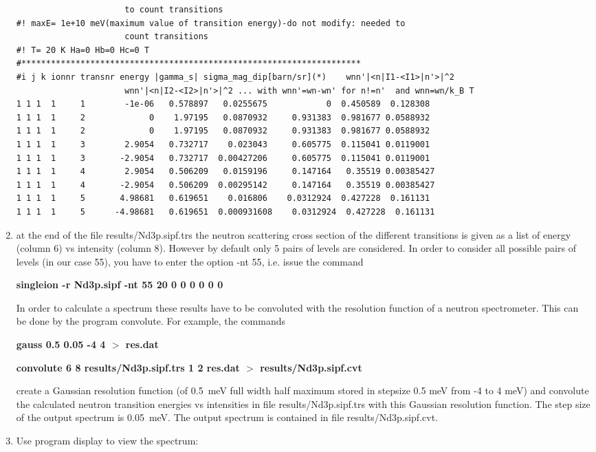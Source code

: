 \begin{enumerate}
{\begin{verbatim}
                      to count transitions
#! maxE= 1e+10 meV(maximum value of transition energy)-do not modify: needed to 
                      count transitions
#! T= 20 K Ha=0 Hb=0 Hc=0 T
#*********************************************************************
#i j k ionnr transnr energy |gamma_s| sigma_mag_dip[barn/sr](*)    wnn'|<n|I1-<I1>|n'>|^2 
                      wnn'|<n|I2-<I2>|n'>|^2 ... with wnn'=wn-wn' for n!=n'  and wnn=wn/k_B T 
1 1 1  1     1        -1e-06   0.578897   0.0255675            0  0.450589  0.128308
1 1 1  1     2             0    1.97195   0.0870932     0.931383  0.981677 0.0588932
1 1 1  1     2             0    1.97195   0.0870932     0.931383  0.981677 0.0588932
1 1 1  1     3        2.9054   0.732717    0.023043     0.605775  0.115041 0.0119001
1 1 1  1     3       -2.9054   0.732717  0.00427206     0.605775  0.115041 0.0119001
1 1 1  1     4        2.9054   0.506209   0.0159196     0.147164   0.35519 0.00385427
1 1 1  1     4       -2.9054   0.506209  0.00295142     0.147164   0.35519 0.00385427
1 1 1  1     5       4.98681   0.619651    0.016806    0.0312924  0.427228  0.161131
1 1 1  1     5      -4.98681   0.619651  0.000931608    0.0312924  0.427228  0.161131
\end{verbatim}
}
\item at the end of the file {\prg results/Nd3p.sipf.trs} the neutron scattering cross 
section of the different 
transitions is given as a list of energy (column 6) vs intensity (column 8).
However by default only 5 pairs of levels are considered. In order to consider all
possible pairs of levels (in our case 55), you have to enter the option {\prg  -nt 55}, i.e.
issue the command

{\bf singleion -r Nd3p.sipf -nt 55  20 0 0 0  0 0 0} 

In order to calculate a spectrum these results
have to be convoluted with the resolution function of a neutron spectrometer. This can be 
done by the program {\prg convolute}. For example, the commands
 
 {\bf gauss 0.5 0.05 -4 4 $>$ res.dat}

 {\bf convolute 6 8 results/Nd3p.sipf.trs 1 2 res.dat $>$ results/Nd3p.sipf.cvt} 

create a Gaussian resolution function (of 0.5~meV full width half maximum stored in
stepsize 0.5 meV from -4 to 4 meV) and convolute the calculated neutron 
transition energies vs intensities in file {\prg results/Nd3p.sipf.trs}
with this Gaussian resolution function. The step size of the
output spectrum is 0.05~meV. The output spectrum is contained in file {\prg results/Nd3p.sipf.cvt}.
\item 
Use program  {\prg display}
 to view the spectrum: 


\end{enumerate}
